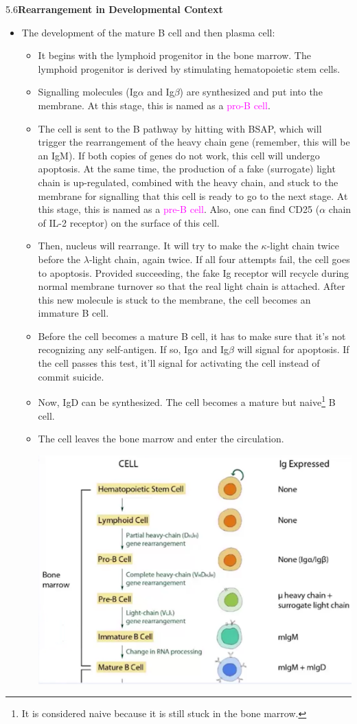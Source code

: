 \documentclass[UTF8]{book}
\newcommand{\pink}[1]{\textcolor{magenta}{#1}}
\begin{document}
5.6\quad \textbf{Rearrangement in Developmental Context}
\begin{itemize}
\item The development of the mature B cell and then plasma cell:
\begin{itemize}
	\item It begins with the lymphoid progenitor in the bone marrow. The lymphoid progenitor is derived by stimulating hematopoietic stem cells.
	\item Signalling molecules (Ig$\alpha$ and Ig$\beta$) are synthesized and put into the membrane. At this stage, this is named as a \pink{pro-B cell}.
	\item The cell is sent to the B pathway by hitting with BSAP, which will trigger the rearrangement of the heavy chain gene (remember, this will be an IgM). If both copies of genes do not work, this cell will undergo apoptosis. At the same time, the production of a fake (surrogate) light chain is up-regulated, combined with the heavy chain, and stuck to the membrane for signalling that this cell is ready to go to the next stage. At this stage, this is named as a \pink{pre-B cell}. Also, one can find CD25 ($\alpha$ chain of IL-2 receptor) on the surface of this cell.
	\item Then, nucleus will rearrange. It will try to make the $\kappa$-light chain twice before the $\lambda$-light chain, again twice. If all four attempts fail, the cell goes to apoptosis. Provided succeeding, the fake Ig receptor will recycle during normal membrane turnover so that the real light chain is attached. After this new molecule is stuck to the membrane, the cell becomes an immature B cell.
	\item Before the cell becomes a mature B cell, it has to make sure that it's not recognizing any self-antigen. If so, Ig$\alpha$ and Ig$\beta$ will signal for apoptosis. If the cell passes this test, it'll signal for activating the cell instead of commit suicide.
	\item Now, IgD can be synthesized. The cell becomes a mature but naive\footnote{It is considered naive because it is still stuck in the bone marrow.} B cell.
	\item The cell leaves the bone marrow and enter the circulation.
	\begin{center}
	\includegraphics[scale=0.35]{5.6.1.png}

\end{center}
\end{itemize}
\end{itemize}
\end{document}
